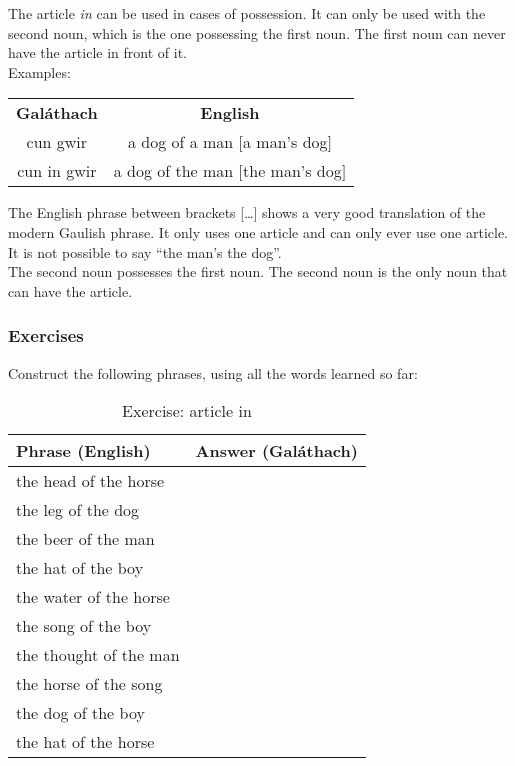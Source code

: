 The article \textit{in} can be used in cases of possession. It can only be used with the second noun, which is the one possessing the first noun. The first noun can never have the article in front of it.\\
Examples:
\begin{table}[H]
\centering
\begin{tabular}{cc}
  \toprule
  \textbf{Gal\'{a}thach} & \textbf{English}\\
  \cmidrule(lr){1-1}\cmidrule(lr){2-2}
  cun gwir & a dog of a man $[$a man's dog$]$\\
  cun in gwir & a dog of the man $[$the man's dog$]$\\
  \bottomrule
\end{tabular}
\label{examples_possession_first_noun_no_particle_in_front}
\end{table}

The English phrase between brackets [\dots] shows a very good translation of the modern Gaulish phrase. It only uses one article and can only ever use one article. It is not possible to say ``the man's the dog''.\\

The second noun possesses the first noun. The second noun is the only noun that can have the article.

\newpage
\subsubsection{Exercises}

Construct the following phrases, using all the words learned so far:
\begin{table}[H]
\centering
\begin{tabular}{|l|M{10.0cm}|}
  \toprule
  \textbf{Phrase (English)} & \textbf{Answer (Gal\'{a}thach)}\\
  \toprule
  the head of the horse & \\
  \midrule
  the leg of the dog & \\
  \midrule
  the beer of the man & \\
  \midrule
  the hat of the boy & \\
  \midrule
  the water of the horse & \\
  \midrule
  the song of the boy & \\
  \midrule
  the thought of the man & \\
  \midrule
  the horse of the song & \\
  \midrule
  the dog of the boy & \\
  \midrule
  the hat of the horse & \\
  \bottomrule
\end{tabular}
\label{exercise_article_in}
\caption{Exercise: article in}
\end{table}

